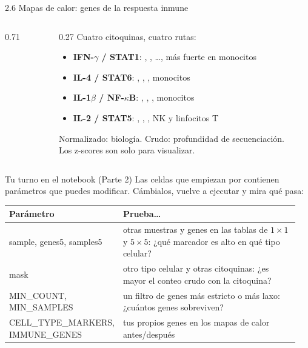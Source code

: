 \begin{frame}{2.6 Mapas de calor: genes de la respuesta inmune}
  \begin{columns}[c]
    \begin{column}{0.71\linewidth}
    \end{column}
    \begin{column}{0.27\linewidth}\scriptsize
      Cuatro citoquinas, cuatro rutas:
      \begin{itemize}\setlength\itemsep{3pt}
        \item \textbf{IFN-$\gamma$ / STAT1}: , , \ldots, más fuerte en monocitos
        \item \textbf{IL-4 / STAT6}: , , , monocitos
        \item \textbf{IL-1$\beta$ / NF-$\kappa$B}: , , , monocitos
        \item \textbf{IL-2 / STAT5}: , , , NK y linfocitos T
      \end{itemize}
      \alert{Normalizado: biología. Crudo: profundidad de secuenciación.}\\[2pt]
      Los z-scores son solo para visualizar.
    \end{column}
  \end{columns}
\end{frame}

\begin{frame}{Tu turno en el notebook (Parte 2)}
  \small
  Las celdas que empiezan por  contienen parámetros que puedes modificar. Cámbialos, vuelve a ejecutar y mira qué pasa:
  \vspace{0.2cm}

  \begin{tabular}{@{}>{\ttfamily}p{0.27\linewidth}>{\raggedright\arraybackslash}p{0.68\linewidth}@{}}
    \toprule
    \textrm{\textbf{Parámetro}} & \textbf{Prueba\ldots}\\\midrule
    sample, genes5, samples5 & otras muestras y genes en las tablas de $1\times1$ y $5\times5$: ¿qué marcador es alto en qué tipo celular?\\[2pt]
    mask & otro tipo celular y otras citoquinas: ¿es mayor el conteo crudo con la citoquina?\\[2pt]
    MIN\_COUNT, MIN\_SAMPLES & un filtro de genes más estricto o más laxo: ¿cuántos genes sobreviven?\\[2pt]
    CELL\_TYPE\_MARKERS, IMMUNE\_GENES & tus propios genes en los mapas de calor antes/después\\
    \bottomrule
  \end{tabular}
\end{frame}


